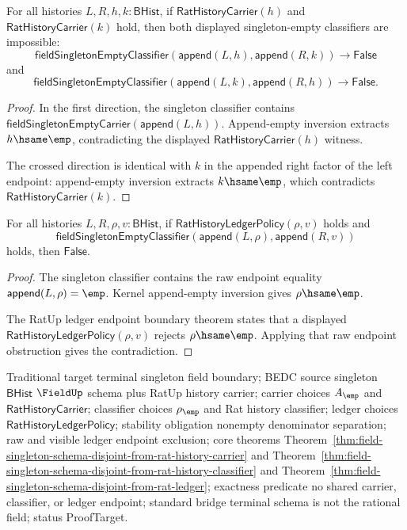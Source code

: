 \begin{theorem}
\label{thm:field-singleton-empty-classifier-cross-rat-history-carrier-absurd}
For all histories $L,R,h,k:\mathsf{BHist}$, if
$\mathsf{RatHistoryCarrier}(h)$ and $\mathsf{RatHistoryCarrier}(k)$ hold, then
both displayed singleton-empty classifiers are impossible:
$$
\mathsf{fieldSingletonEmptyClassifier}(\mathsf{append}(L,h),\mathsf{append}(R,k))
\to\mathsf{False}
$$
and
$$
\mathsf{fieldSingletonEmptyClassifier}(\mathsf{append}(L,k),\mathsf{append}(R,h))
\to\mathsf{False}.
$$
\end{theorem}
\begin{proof}
In the first direction, the singleton classifier contains
$\mathsf{fieldSingletonEmptyCarrier}(\mathsf{append}(L,h))$. Append-empty
inversion extracts $h\hsame\emp$, contradicting the displayed
$\mathsf{RatHistoryCarrier}(h)$ witness.

The crossed direction is identical with $k$ in the appended right factor of
the left endpoint: append-empty inversion extracts $k\hsame\emp$, which
contradicts $\mathsf{RatHistoryCarrier}(k)$.
\end{proof}

\begin{theorem}
\label{thm:field-singleton-empty-classifier-append-rat-ledger-absurd}
For all histories $L,R,\rho,v:\mathsf{BHist}$, if
$\mathsf{RatHistoryLedgerPolicy}(\rho,v)$ holds and
$$
\mathsf{fieldSingletonEmptyClassifier}(\mathsf{append}(L,\rho),\mathsf{append}(R,v))
$$
holds, then $\mathsf{False}$.
\end{theorem}
\begin{proof}
The singleton classifier contains the raw endpoint equality
$\mathsf{append}(L,\rho)=\emp$. Kernel append-empty inversion gives
$\rho\hsame\emp$.

The RatUp ledger endpoint boundary theorem states that a displayed
$\mathsf{RatHistoryLedgerPolicy}(\rho,v)$ rejects $\rho\hsame\emp$. Applying
that raw endpoint obstruction gives the contradiction.
\end{proof}

Traditional target terminal singleton field boundary; BEDC source singleton
$\mathsf{BHist}$ $\FieldUp$ schema plus RatUp history carrier; carrier choices
$A_{\emp}$ and $\mathsf{RatHistoryCarrier}$; classifier choices $\rho_{\emp}$
and Rat history classifier; ledger choices
$\mathsf{RatHistoryLedgerPolicy}$; stability obligation nonempty denominator
separation; raw and visible ledger endpoint exclusion; core theorems
Theorem~\ref{thm:field-singleton-schema-disjoint-from-rat-history-carrier} and
Theorem~\ref{thm:field-singleton-schema-disjoint-from-rat-history-classifier}
and Theorem~\ref{thm:field-singleton-schema-disjoint-from-rat-ledger};
exactness predicate no shared carrier, classifier, or ledger endpoint; standard
bridge terminal schema is not the rational field; status ProofTarget.

